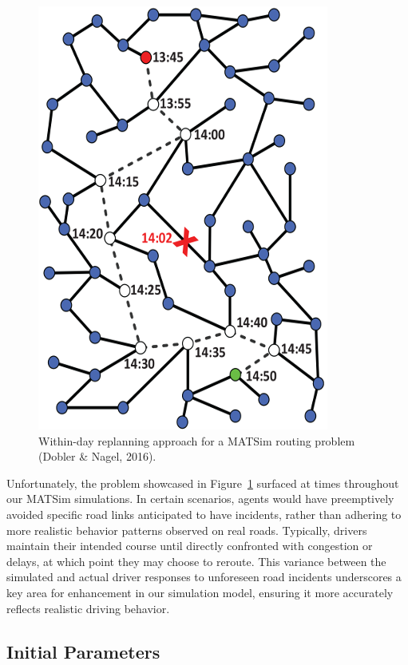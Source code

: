 \documentclass[fancy, oneside, mastersfancy, ms]{byuthesis}
\begin{document}
\begin{figure}

{\centering \includegraphics{figures/within_day.png}

}

\caption{\label{fig-within_day}Within-day replanning approach for a
MATSim routing problem (Dobler \& Nagel, 2016).}

\end{figure}

Unfortunately, the problem showcased in Figure~\ref{fig-within_day}
surfaced at times throughout our MATSim simulations. In certain
scenarios, agents would have preemptively avoided specific road links
anticipated to have incidents, rather than adhering to more realistic
behavior patterns observed on real roads. Typically, drivers maintain
their intended course until directly confronted with congestion or
delays, at which point they may choose to reroute. This variance between
the simulated and actual driver responses to unforeseen road incidents
underscores a key area for enhancement in our simulation model, ensuring
it more accurately reflects realistic driving behavior.

\hypertarget{sec-parameters}{%
\subsection{Initial Parameters}\label{sec-parameters}}
\end{document}
